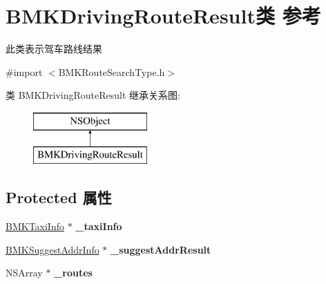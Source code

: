 \hypertarget{interface_b_m_k_driving_route_result}{}\section{B\+M\+K\+Driving\+Route\+Result类 参考}
\label{interface_b_m_k_driving_route_result}


此类表示驾车路线结果  




{\ttfamily \#import $<$B\+M\+K\+Route\+Search\+Type.\+h$>$}

类 B\+M\+K\+Driving\+Route\+Result 继承关系图\+:\begin{figure}[H]
\begin{center}
\leavevmode
\includegraphics[height=2.000000cm]{interface_b_m_k_driving_route_result}
\end{center}
\end{figure}
\subsection*{Protected 属性}
\begin{DoxyCompactItemize}
\item 
\hypertarget{interface_b_m_k_driving_route_result_ad4dfb5abdc9df74cda947b4796879a13}{}\hyperlink{interface_b_m_k_taxi_info}{B\+M\+K\+Taxi\+Info} $\ast$ {\bfseries \+\_\+taxi\+Info}\label{interface_b_m_k_driving_route_result_ad4dfb5abdc9df74cda947b4796879a13}

\item 
\hypertarget{interface_b_m_k_driving_route_result_a7401197c1f543949165707362be5fcbb}{}\hyperlink{interface_b_m_k_suggest_addr_info}{B\+M\+K\+Suggest\+Addr\+Info} $\ast$ {\bfseries \+\_\+suggest\+Addr\+Result}\label{interface_b_m_k_driving_route_result_a7401197c1f543949165707362be5fcbb}

\item 
\hypertarget{interface_b_m_k_driving_route_result_a3a5b54ae9219585248392bbeaa5d9c42}{}N\+S\+Array $\ast$ {\bfseries \+\_\+routes}\label{interface_b_m_k_driving_route_result_a3a5b54ae9219585248392bbeaa5d9c42}

\end{DoxyCompactItemize}
